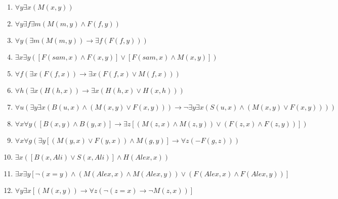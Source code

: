 \documentclass[a4paper,12pt]{article}
\begin{document}
\begin{tcolorbox}

\begin{enumerate}[label=\textbf{\arabic*})]
\item $\forall y \exists x (M(x,y))$
\item $\forall y \exists f \exists m (M(m,y) \wedge F(f,y))$
\item $\forall y (\exists m (M(m,y)) \rightarrow \exists f(F(f,y)))$
\item $\exists x \exists y ([F(sam,x) \wedge F(x,y)] \vee [F(sam,x) \wedge M(x,y)])$
\item $\forall f (\exists x (F(f,x)) \rightarrow \exists x (F(f,x) \vee M(f,x)))$
\item $\forall h (\exists x (H(h,x)) \rightarrow \exists x (H(h,x) \vee H(x,h)))$
\item $\forall u (\exists y \exists x(B(u,x) \wedge (M(x,y) \vee F(x,y))) \rightarrow \neg \exists y \exists x (S(u,x) \wedge (M(x,y) \vee F(x,y))))$
\item $\forall x \forall y ([B(x,y) \wedge B(y,x)] \rightarrow \exists z[(M(z,x) \wedge M(z,y)) \vee (F(z,x) \wedge F(z,y))])$
\item $\forall x \forall g(\exists y[(M(y,x) \vee F(y,x)) \wedge M(g,y)] \rightarrow \forall z(-F(g,z))) $
\item $\exists x([B(x,Ali) \vee S(x,Ali)] \wedge H(Alex,x))$
\item $\exists x \exists y [\neg (x = y) \wedge (M(Alex,x) \wedge M(Alex,y)) \vee (F(Alex,x) \wedge F(Alex,y))]$
\item $\forall y \exists x [(M(x,y)) \rightarrow \forall z (\neg (z = x) \rightarrow \neg M(z,x))]$
\end{enumerate}

\end{tcolorbox}


\newpage
\end{document}
